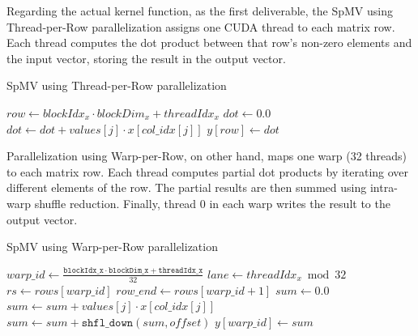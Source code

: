 \documentclass[conference]{IEEEtran}
\begin{document}
Regarding the actual kernel function, as the first deliverable, the SpMV using Thread-per-Row parallelization assigns one CUDA thread to each matrix row. Each thread computes the dot product between that row's non-zero elements and the input vector, storing the result in the output vector.
\begin{algorithm}[ht]
    \caption{SpMV using Thread-per-Row parallelization}
    \label{simplethread}
    \begin{algorithmic}[1]
        \State $row \gets blockIdx_x \cdot blockDim_x + threadIdx_x$
            \State $dot \gets 0.0$
                \State $dot \gets dot + values[j] \cdot x[col\_idx[j]]$
            \EndFor
            \State $y[row] \gets dot$
        \EndIf
    \EndProcedure
    \end{algorithmic}
\end{algorithm}

Parallelization using Warp-per-Row, on other hand, maps one warp (32 threads) to each matrix row. Each thread computes partial dot products by iterating over different elements of the row. The partial results are then summed using intra-warp shuffle reduction. Finally, thread 0 in each warp writes the result to the output vector.

\begin{algorithm}[ht]
\caption{SpMV using Warp-per-Row parallelization}
\label{simplewarp}
\begin{algorithmic}[1]
    \State $warp\_id \gets \frac{\texttt{blockIdx\_x} \cdot \texttt{blockDim\_x} + \texttt{threadIdx\_x}}{32}$
    \State $lane \gets threadIdx_x \bmod 32$
        \State $rs \gets rows[warp\_id]$
        \State $row\_end \gets rows[warp\_id + 1]$
        \State $sum \gets 0.0$
            \State $sum \gets sum + values[j] \cdot x[col\_idx[j]]$
        \EndFor
            \State $sum \gets sum + \texttt{shfl\_down}(sum, offset)$
        \EndFor
            \State $y[warp\_id] \gets sum$
        \EndIf
    \EndIf
\EndProcedure
\end{algorithmic}
\end{algorithm}
\end{document}
